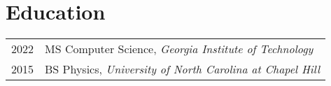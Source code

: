 \documentclass[a4paper, 9pt]{article} %
\begin{document}
\begin{tabular}{r|p{14cm}}

\end{tabular}

\vspace{-12pt}
\section{Education}

\begin{tabular}{rl}	
2022 & MS Computer Science, \emph{Georgia Institute of Technology}\\
2015 & BS Physics, \emph{University of North Carolina at Chapel Hill}\\




\end{tabular}
\bigskip
\end{document}
